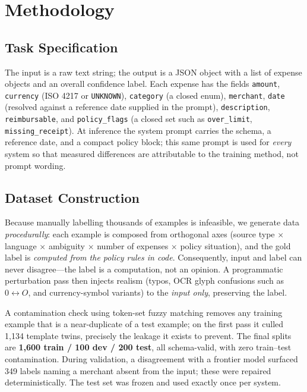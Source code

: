 \documentclass[conference]{IEEEtran}
\begin{document}
\section{Methodology}

\subsection{Task Specification}
The input is a raw text string; the output is a JSON object with a list of
expense objects and an overall confidence label. Each expense has the fields
\texttt{amount}, \texttt{currency} (ISO 4217 or \texttt{UNKNOWN}),
\texttt{category} (a closed enum), \texttt{merchant}, \texttt{date}
(resolved against a reference date supplied in the prompt),
\texttt{description}, \texttt{reimbursable}, and \texttt{policy\_flags} (a
closed set such as \texttt{over\_limit}, \texttt{missing\_receipt}). At
inference the system prompt carries the schema, a reference date, and a compact
policy block; this same prompt is used for \emph{every} system so that measured
differences are attributable to the training method, not prompt wording.

\subsection{Dataset Construction}
Because manually labelling thousands of examples is infeasible, we generate
data \emph{procedurally}: each example is composed from orthogonal axes
(source type $\times$ language $\times$ ambiguity $\times$ number of expenses
$\times$ policy situation), and the gold label is \emph{computed from the
policy rules in code}. Consequently, input and label can never disagree---the
label is a computation, not an opinion. A programmatic perturbation pass then
injects realism (typos, OCR glyph confusions such as $0\!\leftrightarrow\!O$,
and currency-symbol variants) to the \emph{input only}, preserving the label.

A contamination check using token-set fuzzy matching removes any training
example that is a near-duplicate of a test example; on the first pass it culled
1{,}134 template twins, precisely the leakage it exists to prevent. The final
splits are \textbf{1{,}600 train / 100 dev / 200 test}, all schema-valid, with
zero train--test contamination. During validation, a disagreement with a
frontier model surfaced 349 labels naming a merchant absent from the input;
these were repaired deterministically. The test set was frozen and used exactly
once per system.
\end{document}
